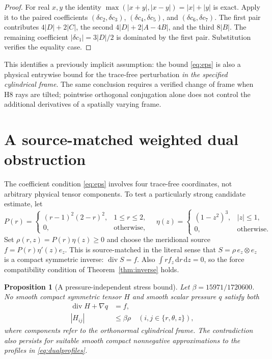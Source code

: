 \documentclass[11pt,a4paper]{article}
\theoremstyle{plain}
\newtheorem{proposition}[theorem]{Proposition}
\theoremstyle{definition}
\newcommand{\diver}{\operatorname{div}}
\newcommand{\dd}{\,\mathrm{d}}
\begin{document}
\begin{proof}
For real $x,y$ the identity
$\max(|x+y|,|x-y|)=|x|+|y|$ is exact.
Apply it to the paired coefficients $(\delta c_2,\delta c_3)$,
$(\delta c_4,\delta c_5)$, and $(\delta c_6,\delta c_7)$.
The first pair contributes $4|D|+2|C|$, the second
$4|D|+2|A-4B|$, and the third $8|B|$. The remaining
coefficient $|\delta c_1|=3|D|/2$ is dominated by the first
pair. Substitution verifies the equality case.
\end{proof}

This identifies a previously implicit assumption: the bound
\eqref{eq:eps} is also a physical entrywise bound for the trace-free
perturbation \emph{in the specified cylindrical frame}. The same
conclusion requires a verified change of frame when H8 rays are tilted;
pointwise orthogonal conjugation alone does not control the additional
derivatives of a spatially varying frame.

\section{A source-matched weighted dual obstruction}\label{sec:dual}

The coefficient condition \eqref{eq:eps} involves four trace-free
coordinates, not arbitrary physical tensor components. To test a
particularly strong candidate estimate, let
\begin{equation}\label{eq:dualprofiles}
 P(r)=\begin{cases}(r-1)^2(2-r)^2,&1\le r\le2,\\0,&\text{otherwise},\end{cases}
 \quad
 \eta(z)=\begin{cases}(1-z^2)^3,&|z|\le1,\\0,&\text{otherwise}.\end{cases}
\end{equation}
Set $\rho(r,z)=P(r)\eta(z)\ge0$ and choose the meridional
source $f=P(r)\eta'(z)e_z$. This is source-matched in the literal sense
that $S=\rho\,e_z\otimes e_z$ is a compact symmetric inverse:
$\diver S=f$. Also $\int r f_z\dd r\dd z=0$, so the force
compatibility condition of Theorem~\ref{thm:inverse} holds.

\begin{proposition}[A pressure-independent stress bound]
\label{prop:dual}
Let $\beta=15971/1720600$. No smooth compact symmetric tensor $H$
and smooth scalar pressure $q$ satisfy both
\begin{equation}\label{eq:dualprob}
\begin{aligned}
 \diver H+\nabla q&=f,\\
 |H_{ij}|&\le\beta\rho\quad(i,j\in\{r,\theta,z\}),
\end{aligned}
\end{equation}
where components refer to the \emph{orthonormal cylindrical frame}.
The contradiction also persists for suitable smooth compact
nonnegative approximations to the profiles in \eqref{eq:dualprofiles}.
\end{proposition}
\end{document}
